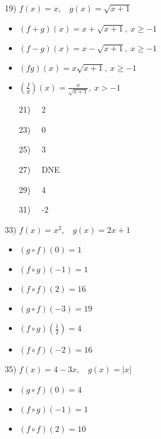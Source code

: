 \documentclass[11pt]{book}
\theoremstyle{definition}  %
\begin{document}
19) $f(x)=x,~~~~g(x)=\sqrt{x+1}$ 
\scriptsize
\begin{multicols}{2}
\begin{itemize}
\item  $(f+g)(x)=x+\sqrt{x+1},~x\geq-1$
\item  $(f-g)(x)=x-\sqrt{x+1},~x\geq-1$
\end{itemize}
\end{multicols}
\begin{multicols}{2}
\begin{itemize}
\item  $(fg)(x)=x\sqrt{x+1},~x\geq-1$
\item  $\left(\frac{f}{g}\right)(x)=\frac{x}{\sqrt{x+1}},~x>-1$
\end{itemize}
\end{multicols}
\normalsize

\begin{multicols}{2}
\begin{enumerate}
\item[21)]~~2
\item[23)]~~0
\item[25)]~~3
\item[27)]~~DNE
\item[29)]~~4
\item[31)]~~-2
\end{enumerate}
\end{multicols}

33) $f(x)=x^2,~~~~g(x)=2x+1$
\scriptsize
\begin{multicols}{3}
\begin{itemize}
\item  $(g\circ f)(0)=1$
\item  $(f\circ g)(-1)=1$
\item  $(f\circ f)(2)=16$
\end{itemize}
\end{multicols}

\begin{multicols}{3}
\begin{itemize}
\item  $(g\circ f)(-3)=19$
\item  $(f\circ g)(\frac{1}{2})=4$
\item  $(f\circ f)(-2)=16$
\end{itemize}
\end{multicols}
\normalsize

35) $f(x)=4-3x,~~~~g(x)=|x|$
\scriptsize
\begin{multicols}{3}
\begin{itemize}
\item  $(g\circ f)(0)=4$
\item  $(f\circ g)(-1)=1$
\item  $(f\circ f)(2)=10$
\end{itemize}
\end{multicols}
\end{document}

